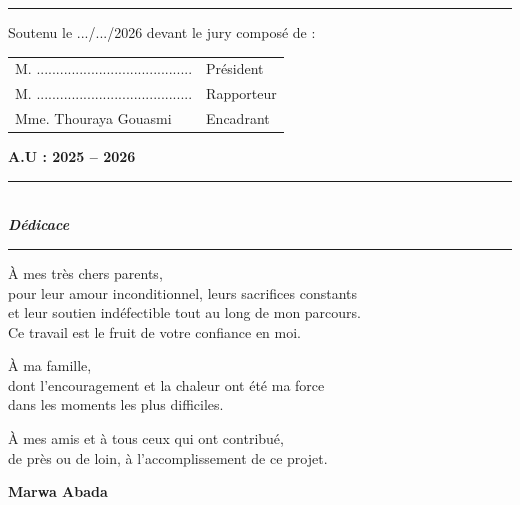 \documentclass[12pt,a4paper]{report}
\begin{document}
\begin{titlepage}
\begin{center}
\rule{7cm}{0.8pt}

\vspace{0.2cm}

\small
Soutenu le .../.../2026 devant le jury composé de :

\vspace{0.3cm}

\begin{tabular}{p{7.5cm}p{3.5cm}}
M. ........................................ & Président \\
M. ........................................ & Rapporteur \\
Mme. Thouraya Gouasmi & Encadrant \\
\end{tabular}

\vfill

{\large \textbf{A.U : 2025 -- 2026}}

\end{center}
\end{titlepage}

\thispagestyle{empty}
\null\vfill
\begin{center}
  {\color{black}\rule{0.6\textwidth}{1pt}}\\[1cm]
  {\Large\itshape\bfseries Dédicace}\\[1cm]
  {\color{black}\rule{0.6\textwidth}{0.4pt}}
\end{center}
\vspace{1cm}

\begin{center}
\begin{minipage}{0.75\textwidth}
\setlength{\parindent}{0pt}
\setlength{\parskip}{0.8em}
\itshape

À mes très chers parents,\\
pour leur amour inconditionnel, leurs sacrifices constants\\
et leur soutien indéfectible tout au long de mon parcours.\\
Ce travail est le fruit de votre confiance en moi.

À ma famille,\\
dont l'encouragement et la chaleur ont été ma force\\
dans les moments les plus difficiles.

À mes amis et à tous ceux qui ont contribué,\\
de près ou de loin, à l'accomplissement de ce projet.

\vspace{1em}
\begin{flushright}
\textbf{Marwa Abada}
\end{flushright}
\end{minipage}
\end{center}
\end{document}
